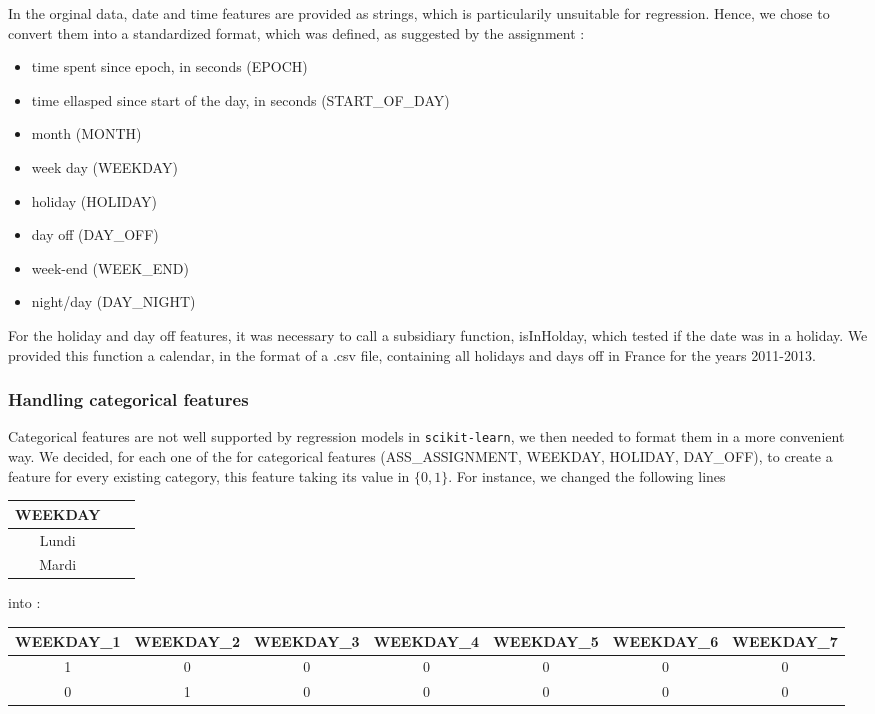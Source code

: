 \documentclass[a4paper,10pt]{article}
\begin{document}
    In the orginal data, date and time features are provided as strings, which is particularily unsuitable for regression. Hence, we chose to convert them into a standardized format, which was defined, as suggested by the assignment :
      \begin{itemize}
        \item time spent since epoch, in seconds (EPOCH)
        \item time ellasped since start of the day, in seconds (START\_OF\_DAY)
        \item month (MONTH)
        \item week day (WEEKDAY)
        \item holiday (HOLIDAY)
        \item day off (DAY\_OFF)
        \item week-end (WEEK\_END)
        \item night/day (DAY\_NIGHT)
      \end{itemize}

    For the holiday and day off features, it was necessary to call a subsidiary function, isInHolday, which tested if the date was in a holiday. We provided this function a calendar, in the format of a .csv file, containing all holidays and days off in France for the years 2011-2013.

    \subsubsection{Handling categorical features}

    Categorical features are not well supported by regression models in {\tt scikit-learn}, we then needed to format them in a more convenient way. We decided, for each one of the for categorical features (ASS\_ASSIGNMENT, WEEKDAY, HOLIDAY, DAY\_OFF), to create a feature for every existing category, this feature taking its value in $\{0,1\}$. For instance, we changed the following lines
    \begin{center}
    {\footnotesize
      \begin{tabular}{|c|c|c|}
        \hline
        WEEKDAY \\
        \hline
        Lundi \\
        \hline
        Mardi \\
        \hline
      \end{tabular}}
    \end{center}
    into :
    \begin{center}
      {\footnotesize
        \begin{tabular}{|c|c|c|c|c|c|c|}
          \hline
          WEEKDAY\_1 & WEEKDAY\_2 & WEEKDAY\_3 & WEEKDAY\_4 & WEEKDAY\_5 & WEEKDAY\_6 & WEEKDAY\_7 \\
          \hline
          1 & 0 & 0 & 0 & 0 & 0 & 0 \\
          \hline
          0 & 1 & 0 & 0 & 0 & 0 & 0 \\
          \hline
        \end{tabular}
      }
    \end{center}
\end{document}

